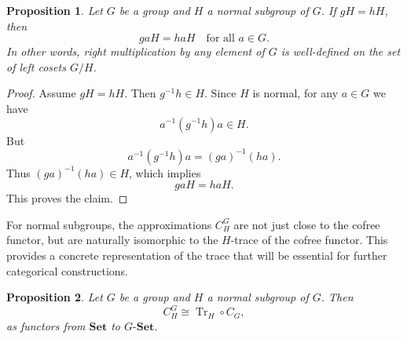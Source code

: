 \documentclass[10pt,a4paper]{amsart}
\newtheorem{proposition}{Proposition}
\begin{document}
\begin{proposition}\label{prop:normal_right_action}
Let $G$ be a group and $H$ a normal subgroup of $G$. If $gH = hH$, then
\[
gaH = haH \quad \text{for all } a \in G.
\]
In other words, right multiplication by any element of $G$ is well-defined on the set of left cosets $G/H$.
\end{proposition}

\begin{proof}
Assume $gH = hH$. Then $g^{-1}h \in H$. Since $H$ is normal, for any $a \in G$ we have
\[
a^{-1}(g^{-1}h)a \in H.
\]
But
\[
a^{-1}(g^{-1}h)a = (ga)^{-1}(ha).
\]
Thus $(ga)^{-1}(ha) \in H$, which implies
\[
gaH = haH.
\]
This proves the claim.
\end{proof}

For normal subgroups, the approximations $C_H^G$ are not just close to the cofree functor, but are naturally isomorphic to the $H$-trace of the cofree functor. This provides a concrete representation of the trace that will be essential for further categorical constructions.

\begin{proposition}\label{prop:CHG_iso}
Let $G$ be a group and $H$ a normal subgroup of $G$. Then
\[
C_H^G \cong \operatorname{Tr}_H \circ C_G,
\]
as functors from $\mathbf{Set}$ to $G\text{-}\mathbf{Set}$.
\end{proposition}
\end{document}

